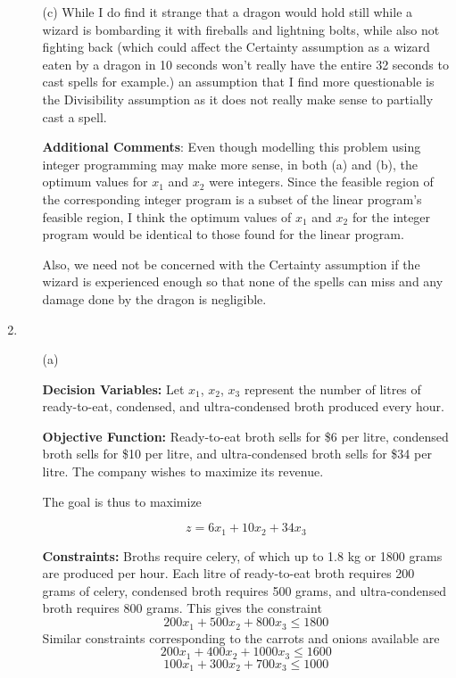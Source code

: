 \documentclass{article}[12pt,a4paper]
\begin{document}
\begin{enumerate}
\begin{enumerate}
   \item[(c)] While I do find it strange that a dragon would hold still while a wizard is bombarding it with fireballs and lightning bolts,
   while also not fighting back (which could affect the Certainty assumption as a wizard eaten by a dragon in 10 seconds won't really
   have the entire 32 seconds to cast spells for example.) an assumption that I find more questionable is the Divisibility assumption
   as it does not really make sense to partially cast a spell. \newline{}
   
   \textbf{Additional Comments}: Even though modelling this problem using integer programming may make more sense, in both (a) 
   and (b), the optimum values for $x_1$ and $x_2$ were integers. Since the feasible region of the corresponding integer program is 
   a subset of the linear program's feasible region, I think the optimum values of $x_1$ and $x_2$ for the integer program would be 
   identical to those found for the linear program.
   
   Also, we need not be concerned with the Certainty assumption if the wizard is experienced enough so that none of the spells can   
   miss and any damage done by the dragon is negligible. 
  \end{enumerate}
  \pagebreak
  
  \item
  \begin{enumerate}
  \item[(a)] 
  
  \textbf{Decision Variables:} Let $x_1$, $x_2$, $x_3$ represent the number of litres of ready-to-eat, condensed,
  and ultra-condensed broth produced every hour. \newline{}
  
  \textbf{Objective Function:} Ready-to-eat broth sells for \$6 per litre, condensed broth sells for \$10 per litre, and
  ultra-condensed broth sells for \$34 per litre. The company wishes to maximize its revenue. 
  
  The goal is thus to maximize
  
  $$z = 6x_1 + 10x_2 + 34x_3$$
  
  \textbf{Constraints:} Broths require celery, of which up to 1.8 kg or 1800 grams are produced per hour.
  Each litre of ready-to-eat broth requires 200 grams of celery, condensed broth requires 500 grams, and ultra-condensed
  broth requires 800 grams. This gives the constraint
  $$200x_1  + 500x_2 + 800x_3 \le 1800$$
  Similar constraints corresponding to the carrots and onions available are
  $$200x_1 + 400x_2 + 1000x_3 \le 1600$$
  $$100x_1 + 300x_2+ 700x_3 \le 1000$$
  

\end{enumerate}
\end{enumerate}
\end{document}
